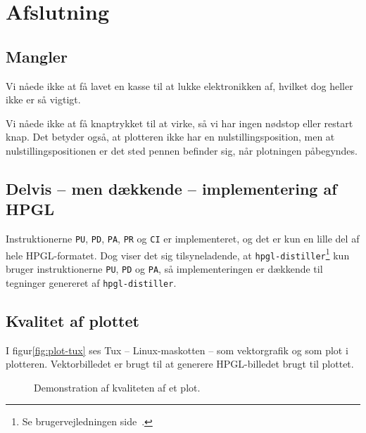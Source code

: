 \chapter{Afslutning}
\label{ch:afslutning}




\section{Mangler}

Vi nåede ikke at få lavet en kasse til at lukke elektronikken af,
hvilket dog heller ikke er så vigtigt.

Vi nåede ikke at få knaptrykket til at virke, så vi har ingen nødstop
eller restart knap. Det betyder også, at plotteren ikke har en
nulstillingsposition, men at nulstillingspositionen er det sted pennen
befinder sig, når plotningen påbegyndes.


\section{Delvis -- men dækkende -- implementering af HPGL}

Instruktionerne \texttt{PU}, \texttt{PD}, \texttt{PA}, \texttt{PR} og
\texttt{CI} er implementeret, og det er kun en lille del af hele
HPGL-formatet. Dog viser det sig tilsyneladende, at
\texttt{hpgl-distiller}\footnote{Se brugervejledningen
  side~\pageref{ch:brugervejledning}.} kun bruger instruktionerne
\texttt{PU}, \texttt{PD} og \texttt{PA}, så implementeringen er
dækkende til tegninger genereret af \texttt{hpgl-distiller}.


\section{Kvalitet af plottet}

I figur\vref{fig:plot-tux} ses Tux -- Linux-maskotten -- som
vektorgrafik og som plot i plotteren. Vektorbilledet er brugt til at
generere HPGL-billedet brugt til plottet. 


\begin{figure}[htbp]
  \centering
  \qquad
  \caption{Demonstration af kvaliteten af et plot.}
  \label{fig:plot-tux}
\end{figure}

